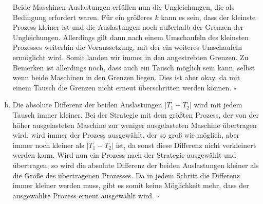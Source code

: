 \documentclass[12pt,a4paper]{article}
\begin{document}
\begin{enumerate}[a)]
		Beide Maschinen-Auslastungen erfüllen nun die Ungleichungen, die als Bedingung erfordert waren. Für ein größeres $k$ kann es sein, dass der kleinste Prozess kleiner ist und die Auslastungen noch außerhalb der Grenzen der Ungleichungen. Allerdings gilt dann nach einem Umschaufeln des kleinsten Prozesses weiterhin die Voraussetzung, mit der ein weiteres Umschaufeln ermöglicht wird. Somit landen wir immer in den angestrebten Grenzen. Zu Bemerken ist allerdings noch, dass auch ein Tausch möglich sein kann, selbst wenn beide Maschinen in den Grenzen liegen. Dies ist aber okay, da mit einem Tausch die Grenzen nicht erneut überschritten werden können. $\square$

	\item Die absolute Differenz der beiden Auslastungen $|T_1 - T_2|$ wird mit jedem Tausch immer kleiner. Bei der Strategie mit dem größten Prozess, der von der höher ausgelasteten Maschine zur weniger ausgelasteten Maschine übertragen wird, wird immer der Prozess ausgewählt, der so groß wie möglich, aber immer noch kleiner als $|T_1 - T_2|$ ist, da sonst diese Differenz nicht verkleinert werden kann. Wird nun ein Prozess nach der Strategie ausgewählt und übertragen, so wird die absolute Differenz der beiden Auslastungen kleiner als die Größe des übertragenen Prozesses. Da in jedem Schritt die Differenz immer kleiner werden muss, gibt es somit keine Möglichkeit mehr, dass der ausgewählte Prozess erneut ausgewählt wird. $\square$
		
\end{enumerate}
\end{document}
